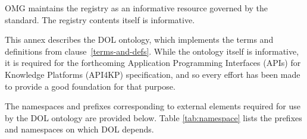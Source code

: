 \documentclass[10pt, a4paper]{isov2}
\newcommand*{\DOL}{\ensuremath{\mathsf{DOL}}\xspace}
\begin{document}
OMG maintains the registry as an informative resource governed by the standard. The registry 
 contents itself is informative. 






\cleardoublepage
\infannex{\DOL Ontology}
\label{a:dol-onto}

This annex describes the DOL ontology, which implements the terms and definitions from
clause~\ref{terms-and-defs}. While the ontology itself is informative, it is required for the 
forthcoming Application Programming Interfaces (APIs) for Knowledge Platforms (API4KP) 
specification, and so every effort has been made to provide a good foundation for that purpose.  

The namespaces and prefixes corresponding to external elements required for use by the DOL ontology
are provided below.  Table \ref{tab:namespace} lists the prefixes and namespaces on which DOL depends.
 
\end{document}
